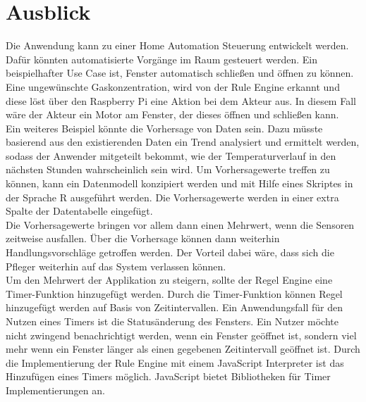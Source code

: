 \chapter{Ausblick}

Die Anwendung kann zu einer Home Automation Steuerung entwickelt werden. Dafür könnten automatisierte Vorgänge im Raum gesteuert werden. Ein beispielhafter Use Case ist, Fenster automatisch schließen und öffnen zu können. Eine ungewünschte Gaskonzentration, wird von der Rule Engine erkannt und diese löst über den Raspberry Pi eine Aktion bei dem Akteur aus. In diesem Fall wäre der Akteur ein Motor am Fenster, der dieses öffnen und schließen kann.\\
Ein weiteres Beispiel könnte die Vorhersage von Daten sein. Dazu müsste basierend aus den existierenden Daten ein Trend analysiert und ermittelt werden, sodass der Anwender mitgeteilt bekommt, wie der Temperaturverlauf in den nächsten Stunden wahrscheinlich sein wird. Um Vorhersagewerte treffen zu können, kann ein Datenmodell konzipiert werden und mit Hilfe eines Skriptes in der Sprache R ausgeführt werden. Die Vorhersagewerte werden in einer extra Spalte der Datentabelle eingefügt.\\
Die Vorhersagewerte bringen vor allem dann einen Mehrwert, wenn die Sensoren zeitweise ausfallen. Über die Vorhersage können dann weiterhin Handlungsvorschläge getroffen werden. Der Vorteil dabei wäre, dass sich die Pfleger weiterhin auf das System verlassen können.\\

Um den Mehrwert der Applikation zu steigern, sollte der Regel Engine eine Timer-Funktion hinzugefügt werden. Durch die Timer-Funktion können Regel hinzugefügt werden auf Basis von Zeitintervallen. Ein Anwendungsfall für den Nutzen eines Timers ist die Statusänderung des Fensters. Ein Nutzer möchte nicht zwingend benachrichtigt werden, wenn ein Fenster geöffnet ist, sondern viel mehr wenn ein Fenster länger als einen gegebenen Zeitintervall geöffnet ist. Durch die Implementierung der Rule Engine mit einem JavaScript Interpreter ist das Hinzufügen eines Timers möglich. JavaScript bietet Bibliotheken für Timer Implementierungen an.
